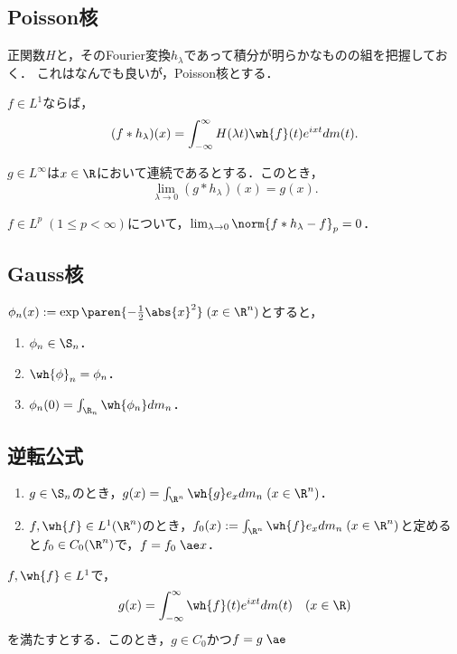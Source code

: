 \documentclass[uplatex,dvipdfmx]{jsreport}
\begin{document}
\subsection{Poisson核}

\begin{tcolorbox}[colframe=ForestGreen, colback=ForestGreen!10!white,breakable,colbacktitle=ForestGreen!40!white,coltitle=black,fonttitle=\bfseries\sffamily,
title=]
    正関数$H$と，そのFourier変換$h_\lambda$であって積分が明らかなものの組を把握しておく．
    これはなんでも良いが，Poisson核とする．
\end{tcolorbox}

\begin{proposition}
    $f\in L^1$ならば，
    \[(f*h_\lambda)(x)=\int^\infty_{-\infty}H(\lambda t)\wh{f}(t)e^{ixt}dm(t).\]
\end{proposition}

\begin{proposition}
    $g\in L^\infty$は$x\in\R$において連続であるとする．このとき，
    \[\lim_{\lambda\to 0}(g*h_\lambda)(x)=g(x).\]
\end{proposition}

\begin{proposition}
    $f\in L^p\;(1\le p<\infty)$について，$\lim_{\lambda\to0}\norm{f*h_\lambda-f}_p=0$．
\end{proposition}

\subsection{Gauss核}

\begin{lemma}
    $\phi_n(x):=\exp\paren{-\frac{1}{2}\abs{x}^2}\;(x\in\R^n)$とすると，
    \begin{enumerate}
        \item $\phi_n\in\S_n$．
        \item $\wh{\phi}_n=\phi_n$．
        \item $\phi_n(0)=\int_{\R_n}\wh{\phi_n}dm_n$．
    \end{enumerate}
\end{lemma}

\subsection{逆転公式}

\begin{theorem}\mbox{}
    \begin{enumerate}
        \item $g\in\S_n$のとき，$g(x)=\int_{\R^n}\wh{g}e_xdm_n\;(x\in\R^n)$．
        \item $f,\wh{f}\in L^1(\R^n)$のとき，$f_0(x):=\int_{\R^n}\wh{f}e_xdm_n\;(x\in\R^n)$と定めると$f_0\in C_0(\R^n)$で，$f=f_0\;\ae x$．
    \end{enumerate}
    $f,\wh{f}\in L^1$で，
    \[g(x)=\int^\infty_{-\infty}\wh{f}(t)e^{ixt}dm(t)\quad(x\in\R)\]
    を満たすとする．このとき，$g\in C_0$かつ$f=g\;\ae$
\end{theorem}
\end{document}
